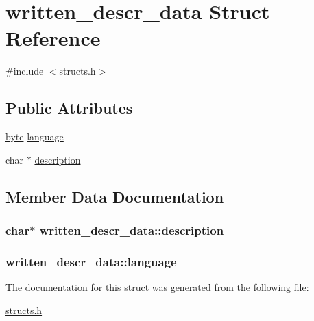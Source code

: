 \hypertarget{structwritten__descr__data}{\section{written\-\_\-descr\-\_\-data Struct Reference}
\label{structwritten__descr__data}
}


{\ttfamily \#include $<$structs.\-h$>$}

\subsection*{Public Attributes}
\begin{DoxyCompactItemize}
\item 
\hyperlink{structs_8h_a2b7e7856b48ec3327148ac994ad95cd5}{byte} \hyperlink{structwritten__descr__data_a26e2f695529f670b9a3a32a47af3819a}{language}
\item 
char $\ast$ \hyperlink{structwritten__descr__data_a2cc83d48eb44a53f648608a60645e931}{description}
\end{DoxyCompactItemize}


\subsection{Member Data Documentation}
\hypertarget{structwritten__descr__data_a2cc83d48eb44a53f648608a60645e931}{
\subsubsection[{description}]{\setlength{\rightskip}{0pt plus 5cm}char$\ast$ written\-\_\-descr\-\_\-data\-::description}}\label{structwritten__descr__data_a2cc83d48eb44a53f648608a60645e931}
\hypertarget{structwritten__descr__data_a26e2f695529f670b9a3a32a47af3819a}{
\subsubsection[{language}]{ written\-\_\-descr\-\_\-data\-::language}}\label{structwritten__descr__data_a26e2f695529f670b9a3a32a47af3819a}


The documentation for this struct was generated from the following file\-:\begin{DoxyCompactItemize}
\item 
\hyperlink{structs_8h}{structs.\-h}\end{DoxyCompactItemize}
